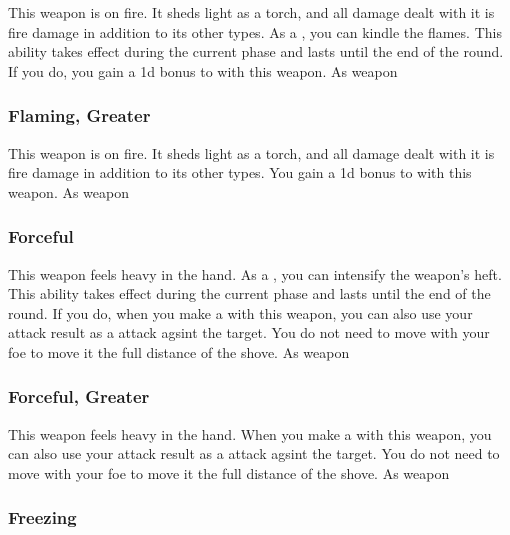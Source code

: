 This weapon is on fire.
It sheds light as a torch, and all damage dealt with it is fire damage in addition to its other types.
As a , you can kindle the flames.
This ability takes effect during the current phase and lasts until the end of the round.
If you do, you gain a \plus1d bonus to  with this weapon.
 
 As weapon
\lowercase{\hypertarget{item:Flaming, Greater}{}}\label{item:Flaming, Greater}
\hypertarget{item:Flaming, Greater}{\subsubsection{Flaming, Greater\hfill{}}}
This weapon is on fire.
It sheds light as a torch, and all damage dealt with it is fire damage in addition to its other types.
You gain a \plus1d bonus to  with this weapon.
 
 As weapon
\lowercase{\hypertarget{item:Forceful}{}}\label{item:Forceful}
\hypertarget{item:Forceful}{\subsubsection{Forceful\hfill{}}}
This weapon feels heavy in the hand.
As a , you can intensify the weapon's heft.
This ability takes effect during the current phase and lasts until the end of the round.
If you do, when you make a  with this weapon, you can also use your attack result as a  attack agsint the target.
You do not need to move with your foe to move it the full distance of the shove.
 
 As weapon
\lowercase{\hypertarget{item:Forceful, Greater}{}}\label{item:Forceful, Greater}
\hypertarget{item:Forceful, Greater}{\subsubsection{Forceful, Greater\hfill{}}}
This weapon feels heavy in the hand.
When you make a  with this weapon, you can also use your attack result as a  attack agsint the target.
You do not need to move with your foe to move it the full distance of the shove.
 
 As weapon
\lowercase{\hypertarget{item:Freezing}{}}\label{item:Freezing}
\hypertarget{item:Freezing}{\subsubsection{Freezing\hfill{}}}
